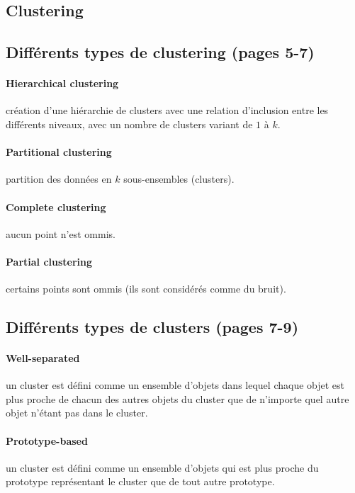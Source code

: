 \documentclass{article}
\begin{document}
\begin{sffamily}
\section{Clustering}

\subsection{Différents types de clustering (pages 5-7)}

\paragraph{Hierarchical clustering} création d'une hiérarchie de clusters avec une relation d'inclusion entre les différents 
niveaux, avec un nombre de clusters variant de $1$ à $k$.

\paragraph{Partitional clustering} partition des données en $k$ sous-ensembles (clusters).

\paragraph{Complete clustering} aucun point n'est ommis.

\paragraph{Partial clustering} certains points sont ommis (ils sont considérés comme du bruit).

\subsection{Différents types de clusters (pages 7-9)}

\paragraph{Well-separated} un cluster est défini comme un ensemble d'objets dans lequel chaque objet est plus proche de chacun des autres 
objets du cluster que de n'importe quel autre objet n'étant pas dans le cluster.

\paragraph{Prototype-based} un cluster est défini comme un ensemble d'objets qui est plus proche du prototype représentant le cluster que 
de tout autre prototype.


\end{sffamily}
\end{document}
